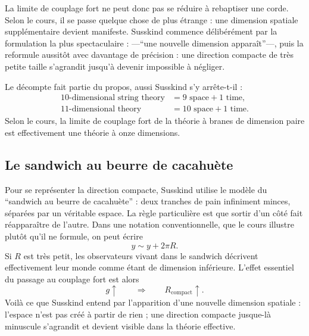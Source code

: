 La limite de couplage fort ne peut donc pas se réduire à rebaptiser une corde. Selon le cours, il se passe quelque chose de plus étrange : une dimension spatiale supplémentaire devient manifeste. Susskind commence délibérément par la formulation la plus spectaculaire : ---``une nouvelle dimension apparaît''---, puis la reformule aussitôt avec davantage de précision : une direction compacte de très petite taille s’agrandit jusqu’à devenir impossible à négliger.

Le décompte fait partie du propos, aussi Susskind s’y arrête-t-il :
\begin{equation}
\begin{aligned}
10\text{-dimensional string theory} &= 9\text{ space}+1\text{ time},\\
11\text{-dimensional theory} &= 10\text{ space}+1\text{ time}.
\end{aligned}
\end{equation}
Selon le cours, la limite de couplage fort de la théorie à branes de dimension paire est effectivement une théorie à onze dimensions.


\subsection{Le sandwich au beurre de cacahuète}

Pour se représenter la direction compacte, Susskind utilise le modèle du ``sandwich au beurre de cacahuète'' : deux tranches de pain infiniment minces, séparées par un véritable espace. La règle particulière est que sortir d’un côté fait réapparaître de l’autre. Dans une notation conventionnelle, que le cours illustre plutôt qu’il ne formule, on peut écrire
\begin{equation}
y \sim y + 2\pi R.
\end{equation}
Si \(R\) est très petit, les observateurs vivant dans le sandwich décrivent effectivement leur monde comme étant de dimension inférieure. L’effet essentiel du passage au couplage fort est alors
\begin{equation}
g\uparrow
\qquad \Longrightarrow \qquad
R_{\mathrm{compact}}\uparrow.
\end{equation}
Voilà ce que Susskind entend par l’apparition d’une nouvelle dimension spatiale : l’espace n’est pas créé à partir de rien ; une direction compacte jusque-là minuscule s’agrandit et devient visible dans la théorie effective.


